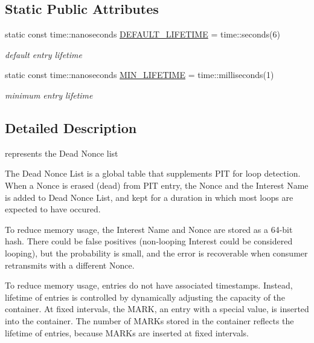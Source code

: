 \subsection*{Static Public Attributes}
\begin{DoxyCompactItemize}
\item 
static const time\+::nanoseconds \hyperlink{classnfd_1_1DeadNonceList_a920d3d1b46f04b27cb162b12c482a3fc}{D\+E\+F\+A\+U\+L\+T\+\_\+\+L\+I\+F\+E\+T\+I\+ME} = time\+::seconds(6)\hypertarget{classnfd_1_1DeadNonceList_a920d3d1b46f04b27cb162b12c482a3fc}{}\label{classnfd_1_1DeadNonceList_a920d3d1b46f04b27cb162b12c482a3fc}

\begin{DoxyCompactList}\small\item\em default entry lifetime \end{DoxyCompactList}\item 
static const time\+::nanoseconds \hyperlink{classnfd_1_1DeadNonceList_ab381814adcd0b687b47162e2a0445535}{M\+I\+N\+\_\+\+L\+I\+F\+E\+T\+I\+ME} = time\+::milliseconds(1)\hypertarget{classnfd_1_1DeadNonceList_ab381814adcd0b687b47162e2a0445535}{}\label{classnfd_1_1DeadNonceList_ab381814adcd0b687b47162e2a0445535}

\begin{DoxyCompactList}\small\item\em minimum entry lifetime \end{DoxyCompactList}\end{DoxyCompactItemize}


\subsection{Detailed Description}
represents the Dead Nonce list 

The Dead Nonce List is a global table that supplements P\+IT for loop detection. When a Nonce is erased (dead) from P\+IT entry, the Nonce and the Interest Name is added to Dead Nonce List, and kept for a duration in which most loops are expected to have occured.

To reduce memory usage, the Interest Name and Nonce are stored as a 64-\/bit hash. There could be false positives (non-\/looping Interest could be considered looping), but the probability is small, and the error is recoverable when consumer retransmits with a different Nonce.

To reduce memory usage, entries do not have associated timestamps. Instead, lifetime of entries is controlled by dynamically adjusting the capacity of the container. At fixed intervals, the M\+A\+RK, an entry with a special value, is inserted into the container. The number of M\+A\+R\+Ks stored in the container reflects the lifetime of entries, because M\+A\+R\+Ks are inserted at fixed intervals. 

